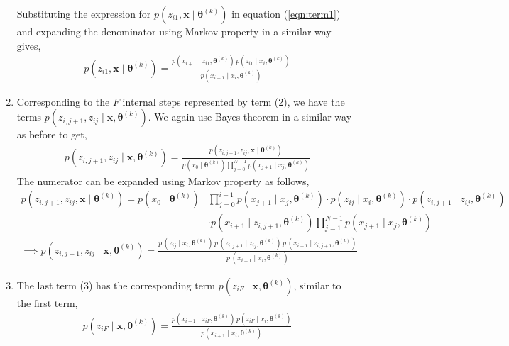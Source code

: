 \documentclass[12pt]{article}
\newcommand{\bx}{\ensuremath{\mathbf{x}}}
\newcommand{\btheta}{\ensuremath{\boldsymbol{\theta}}}
\begin{document}
\begin{enumerate}
Substituting the expression for $p(z_{i1}, \bx \mid \btheta^{(k)})$ in equation (\ref{eqn:term1}) and expanding the denominator using Markov property in a similar way gives,
\begin{align}
p(z_{i1}, \bx \mid \btheta^{(k)}) = \frac{p(x_{i+1} \mid z_{i1}, \btheta^{(k)}) \, p(z_{i1} \mid x_i, \btheta^{(k)})}{p(x_{i+1} \mid x_{i}, \btheta^{(k)})}
\end{align}
\item Corresponding to the $F$ internal steps represented by term (2), we have the terms $p(z_{i,j+1}, z_{ij} \mid \bx, \btheta^{(k)})$. We again use Bayes theorem in a similar way as before to get,
\begin{align}
p(z_{i,j+1}, z_{ij} \mid \bx, \btheta^{(k)}) = \frac{p(z_{i,j+1}, z_{ij}, \bx \mid \btheta^{(k)})}{p(x_0 \mid \btheta^{(k)}) \prod_{j=0}^{N-1} p(x_{j+1} \mid x_{j}, \btheta^{(k)})}
\end{align}
The numerator can be expanded using Markov property as follows,
\begin{align}
p(z_{i,j+1}, z_{ij}, \bx \mid \btheta^{(k)}) = p(x_0 \mid \btheta^{(k)}) & \prod_{j=0}^{i-1} p(x_{j+1} \mid x_j, \btheta^{(k)}) \cdot p(z_{ij} \mid x_i, \btheta^{(k)}) \cdot p(z_{i,j+1} \mid z_{ij}, \btheta^{(k)}) \nonumber \\
& \cdot p(x_{i+1} \mid z_{i,j+1}, \btheta^{(k)}) \prod_{j=1}^{N-1} p(x_{j+1} \mid x_{j}, \btheta^{(k)}) \end{align}
\begin{align}
\implies p(z_{i,j+1}, z_{ij} \mid \bx, \btheta^{(k)}) = \frac{p \, (z_{ij} \mid x_i, \btheta^{(k)}) \, p \, (z_{i,j+1} \mid z_{ij}, \btheta^{(k)}) \, p \, (x_{i+1} \mid z_{i,j+1}, \btheta^{(k)})}{p \, (x_{i+1} \mid x_{i}, \btheta^{(k)})}
\end{align}
\item The last term (3) has the corresponding term $p(z_{iF} \mid \bx, \btheta^{(k)})$, similar to the first term,
\begin{align}
p(z_{iF} \mid \bx, \btheta^{(k)}) = \frac{p(x_{i+1} \mid z_{iF}, \btheta^{(k)}) \, p(z_{iF} \mid x_{i}, \btheta^{(k)})}{p(x_{i+1} \mid x_{i}, \btheta^{(k)})}
\end{align}
\end{enumerate}
\end{document}
